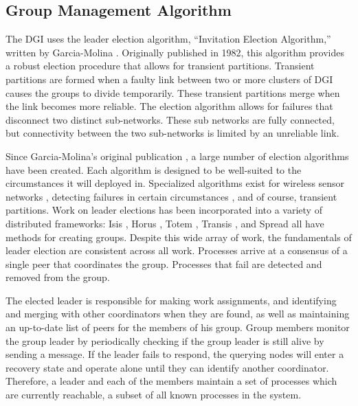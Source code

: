 \subsection{Group Management Algorithm}

The DGI uses the leader election algorithm, ``Invitation Election Algorithm,'' written by Garcia-Molina \cite{INVITATIONELECTION}.
Originally published in 1982, this algorithm provides a robust election  procedure that allows for transient partitions.
Transient partitions are formed when a faulty link between two or more clusters of \ac{DGI} causes the groups to divide temporarily.
These transient partitions merge when the link becomes more reliable.
The election algorithm allows for failures that disconnect two distinct sub-networks.
These sub networks are fully connected, but connectivity between the two sub-networks is limited by an unreliable link.

Since Garcia-Molina's original publication \cite{INVITATIONELECTION}, a large number of election algorithms have been created. 
Each algorithm is designed to be well-suited to the circumstances it will deployed in.
Specialized algorithms exist for wireless sensor networks \cite{LE-WSN-1}\cite{LE-WSN-2}, detecting failures in certain circumstances \cite{LE-SPECIALCIRCUMSTANCES-1}\cite{LE-SPECIALCIRCUMSTANCES-2}, and of course, transient partitions.
Work on leader elections has been incorporated into a variety of distributed frameworks: Isis \cite{ISISTOOLKIT}, Horus \cite{HORUSTOOLKIT}, Totem \cite{TOTEMTOOLKIT}, Transis \cite{TRANSISTOOLKIT}, and Spread \cite{SPREADTOOLKIT} all have methods for creating groups.
Despite this wide array of work, the fundamentals of leader election are consistent
across all work.
Processes arrive at a consensus of a single peer that coordinates the group.
Processes that fail are detected and removed from the group. 

The elected leader is responsible for making work assignments, and identifying and merging with other coordinators when they are found, as well as maintaining an up-to-date list of peers for the members of his group. 
Group members monitor the group leader by periodically checking if the group leader is still alive by sending a message. 
If the leader fails to respond, the querying nodes will enter a recovery state and operate alone until
they can identify another coordinator.
Therefore, a leader and each of the members maintain a set of processes which are currently reachable, a subset of all known processes in the system.

